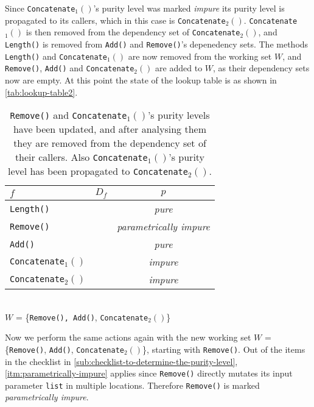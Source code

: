 \documentclass[a4paper,12pt]{article}
\begin{document}
Since \texttt{Concatenate$_1()$}'s purity level was marked \textit{impure} its purity level is propagated to its callers, which in this case is \texttt{Concatenate$_2()$}. \texttt{Concatenate$_1()$} is then removed from the dependency set of \texttt{Concatenate$_2()$}, and \texttt{Length()} is removed from \texttt{Add()} and \texttt{Remove()}'s depenedency sets. The methods \texttt{Length()} and \texttt{Concatenate$_1()$} are now removed from the working set $W$, and \texttt{Remove()}, \texttt{Add()} and \texttt{Concatenate$_2()$} are added to $W$, as their dependency sets now are empty. At this point the state of the lookup table is as shown in \autoref{tab:lookup-table2}.

\begin{table}[H]
  \caption{\texttt{Remove()} and \texttt{Concatenate$_1()$}'s purity levels have been updated, and after analysing them they are removed from the dependency set of their callers. Also \texttt{Concatenate$_1()$}'s purity level has been propagated to \texttt{Concatenate$_2()$}.}
  \label{tab:lookup-table2}
  \centering
  \begin{tabular}{|l|c|c|}
    \hline
    $f$                        & $D_f$                  & $p$                            \\ \hline
    \texttt{Length()}          &                        & \textit{pure}                         \\
    \texttt{Remove()}          &                        & \textit{parametrically impure}        \\
    \texttt{Add()}             &                        & \textit{pure}                         \\
    \texttt{Concatenate$_1()$}  &                        & \textit{impure}                       \\
    \texttt{Concatenate$_2()$}  &                        & \textit{impure}                       \\ \hline
  \end{tabular}
  \\
  $W$ = \{\texttt{\texttt{Remove()}, Add()}, \texttt{Concatenate$_2()$}\}
\end{table}

Now we perform the same actions again with the new working set $W$ = \{\texttt{Remove()}, \texttt{Add()}, \texttt{Concatenate$_2()$}\}, starting with \texttt{Remove()}. Out of the items in the checklist in \autoref{sub:checklist-to-determine-the-purity-level}, \autoref{itm:parametrically-impure} applies since \texttt{Remove()} directly mutates its input parameter \texttt{list} in multiple locations. Therefore \texttt{Remove()} is marked \textit{parametrically impure}.
\end{document}

